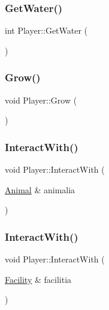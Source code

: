 \mbox{\label{classPlayer_abfe3d14f5555afe748a03e67c9627875}} 
\subsubsection{\texorpdfstring{GetWater()}{GetWater()}}
{\footnotesize\ttfamily int Player\+::\+Get\+Water (\begin{DoxyParamCaption}{ }\end{DoxyParamCaption})}

\mbox{\label{classPlayer_a91c92058dc2edc2a2a954abb6806cf3a}} 
\subsubsection{\texorpdfstring{Grow()}{Grow()}}
{\footnotesize\ttfamily void Player\+::\+Grow (\begin{DoxyParamCaption}{ }\end{DoxyParamCaption})}

\mbox{\label{classPlayer_a0f9bce476bbda5137e3a70e0e741f238}} 
\subsubsection{\texorpdfstring{InteractWith()}{InteractWith()}\hspace{0.1cm}{\footnotesize\ttfamily [1/2]}}
{\footnotesize\ttfamily void Player\+::\+Interact\+With (\begin{DoxyParamCaption}\item[{\mbox{\hyperlink{classAnimal}{Animal}} \&}]{animalia }\end{DoxyParamCaption})}

\mbox{\label{classPlayer_a1a09445ee1de62d3d620bc3fe7339df9}} 
\subsubsection{\texorpdfstring{InteractWith()}{InteractWith()}\hspace{0.1cm}{\footnotesize\ttfamily [2/2]}}
{\footnotesize\ttfamily void Player\+::\+Interact\+With (\begin{DoxyParamCaption}\item[{\mbox{\hyperlink{classFacility}{Facility}} \&}]{facilitia }\end{DoxyParamCaption})}

